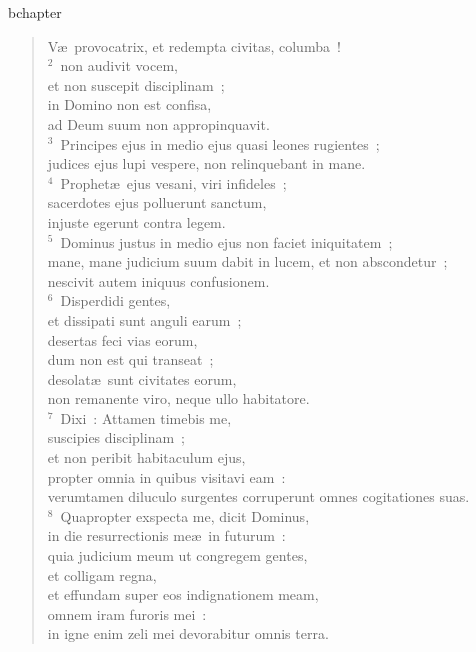 bchapter\begin{flushleft}\begin{verse}\vspace{-19pt}V\ae\ provocatrix, et redempta civitas, columba~!\\
${}^{2}$~non audivit vocem,\\ et non suscepit disciplinam~;\\ in Domino non est confisa,\\ ad Deum suum non appropinquavit.\\
${}^{3}$~Principes ejus in medio ejus quasi leones rugientes~;\\ judices ejus lupi vespere, non relinquebant in mane.\\
${}^{4}$~Prophet\ae\ ejus vesani, viri infideles~;\\ sacerdotes ejus polluerunt sanctum,\\ injuste egerunt contra legem.\\
${}^{5}$~Dominus justus in medio ejus non faciet iniquitatem~;\\ mane, mane judicium suum dabit in lucem, et non abscondetur~;\\ nescivit autem iniquus confusionem.\\
${}^{6}$~Disperdidi gentes,\\ et dissipati sunt anguli earum~;\\ desertas feci vias eorum,\\ dum non est qui transeat~;\\ desolat\ae\ sunt civitates eorum,\\ non remanente viro, neque ullo habitatore.\\
${}^{7}$~Dixi~: Attamen timebis me,\\ suscipies disciplinam~;\\ et non peribit habitaculum ejus,\\ propter omnia in quibus visitavi eam~:\\ verumtamen diluculo surgentes corruperunt omnes cogitationes suas.\\
${}^{8}$~Quapropter exspecta me, dicit Dominus,\\ in die resurrectionis me\ae\ in futurum~:\\ quia judicium meum ut congregem gentes,\\ et colligam regna,\\ et effundam super eos indignationem meam,\\ omnem iram furoris mei~:\\ in igne enim zeli mei devorabitur omnis terra.\end{verse}\end{flushleft}



